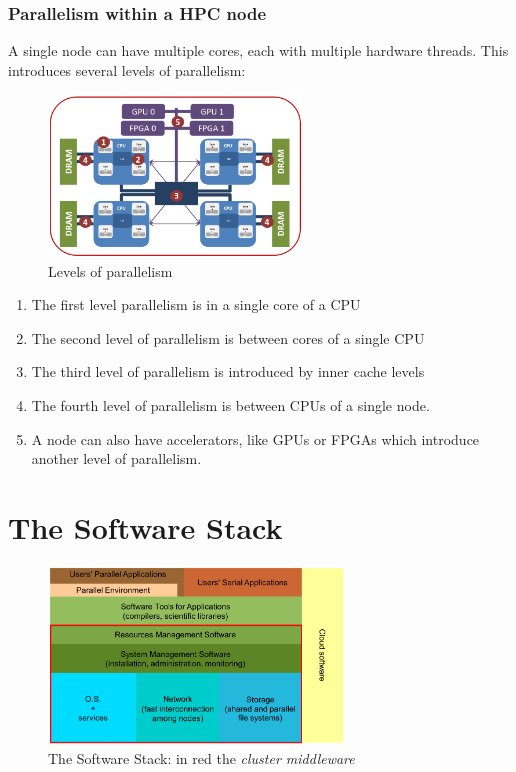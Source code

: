 \subsubsection{Parallelism within a HPC node}

A single node can have multiple cores, each with multiple hardware threads. This introduces several levels of parallelism:

\begin{figure}[H]
    \centering
    \includegraphics[width=0.6\textwidth]{assets/parallelism.png}
    \caption{Levels of parallelism}
    \label{fig:parallelism}
\end{figure}

\begin{enumerate}
    \item The first level parallelism is in a single core of a CPU
    \item The second level of parallelism is between cores of a single CPU
    \item The third level of parallelism is introduced by inner cache levels
    \item The fourth level of parallelism is between CPUs of a single node.
    \item A node can also have accelerators, like GPUs or FPGAs which introduce another level of parallelism.
\end{enumerate}

\newpage

\section{The Software Stack}

\begin{figure}[H]
    \centering
    \includegraphics[width=0.7\textwidth]{assets/software_stack.png}
    \caption{The Software Stack: in red the \textit{cluster middleware}} \label{fig:software_stack}
\end{figure}

